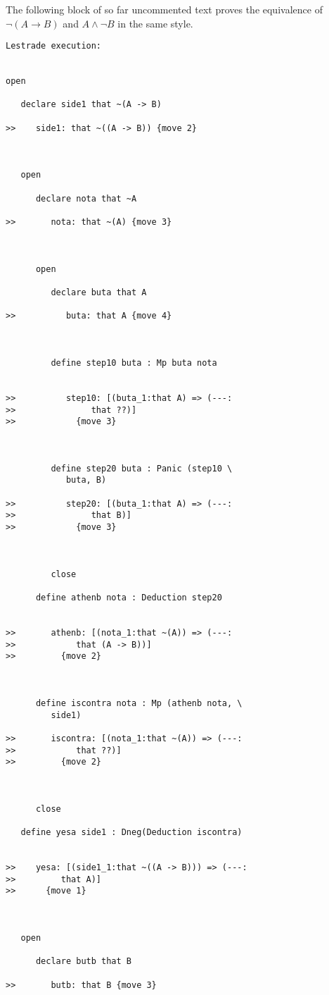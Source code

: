 \documentclass[12pt]{article}
\begin{document}
The following block of so far uncommented text proves the equivalence of $\neg(A \rightarrow B)$ and $A \wedge \neg B$ in the same style.

\begin{verbatim}Lestrade execution:


open

   declare side1 that ~(A -> B)

>>    side1: that ~((A -> B)) {move 2}



   open

      declare nota that ~A

>>       nota: that ~(A) {move 3}



      open

         declare buta that A

>>          buta: that A {move 4}



         define step10 buta : Mp buta nota


>>          step10: [(buta_1:that A) => (---:
>>               that ??)]
>>            {move 3}



         define step20 buta : Panic (step10 \
            buta, B)

>>          step20: [(buta_1:that A) => (---:
>>               that B)]
>>            {move 3}



         close

      define athenb nota : Deduction step20


>>       athenb: [(nota_1:that ~(A)) => (---:
>>            that (A -> B))]
>>         {move 2}



      define iscontra nota : Mp (athenb nota, \
         side1)

>>       iscontra: [(nota_1:that ~(A)) => (---:
>>            that ??)]
>>         {move 2}



      close

   define yesa side1 : Dneg(Deduction iscontra)


>>    yesa: [(side1_1:that ~((A -> B))) => (---:
>>         that A)]
>>      {move 1}



   open

      declare butb that B

>>       butb: that B {move 3}




\end{verbatim}
\end{document}
